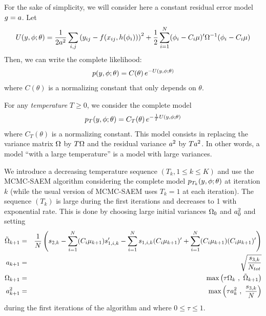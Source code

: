 For the sake of simplicity, we will consider here a constant residual error model $g=a$. Let 
$$ U(\yg,\phig;\theta) = \frac{1}{2\ag^2} \sum_{i,j}\left(y_{ij} - f(x_{ij},h(\phigi)) \right)^2 +\frac{1}{2}\sum_{i=1}^{N}(\phigi-\magi\fixed_effect)^\prime \IIV^{-1}(\phigi-\magi\fixed_effect)$$ 
Then, we can write the complete likelihood:
\begin{eqnarray*}
p(y,{\phi};\theta)  =  C(\theta)\, e^{-U(y,{\phi};\theta)}
\end{eqnarray*}
where $C(\theta)$ is a normalizing constant that only depends on $\theta$.

For any {\it temperature} $T\geq0$, we consider the complete model
\begin{eqnarray*}
p_T(y,{\phi};\theta)  =  C_T(\theta)\, e^{-\frac{1}{T}U(y,{\phi};\theta)}
\end{eqnarray*}
where $C_T(\theta)$ is a normalizing constant. This model consists in replacing the variance matrix ${\Omega}$ by $T{\Omega}$ and the residual variance $a^2$ by $Ta^2$. In other words, a model ``with a large temperature'' is a model with large variances.

We introduce a decreasing temperature sequence $(T_k, 1\leq k \leq K)$ and use the MCMC-SAEM algorithm considering the complete model $p_{T_k}(y,{\phi};\theta)$  at iteration $k$ (while the usual version of MCMC-SAEM uses $T_k=1$ at each iteration). The sequence $(T_k)$ is large during the first iterations and decreases to 1 with exponential rate. This is done by choosing large initial variances ${\Omega}_0$ and $a^2_0$ and setting
\begin{eqnarray}
 \tilde{\IIV}_{k+1} &=& \frac{1}{N} \left(s_{2,k}- \sum_{i=1}^N(\magi\mugkun)s_{1,i,k}^\prime -\sum_{i=1}^N s_{1,i,k}(\magi\mugkun)^\prime +\sum_{i=1}^N (\magi\mugkun)(\magi\mugkun)^\prime\right)  \\
\ag_{k+1} & = & \sqrt{ \frac{s_{3,k}}{N_{tot}} }\\
\IIV_{k+1} &=& \max\left( \tau \IIV_{k}  \ , \ \tilde{\IIV}_{k+1}  \right)  \label{tau1} \\
\ag^2_{k+1} & = &  \max\left( \tau \ag^2_{k} \ , \  \frac{s_{3,k}}{N} \right) \label{tau2}
\end{eqnarray}
during the first iterations of the algorithm and where $0\leq\tau\leq 1$.

